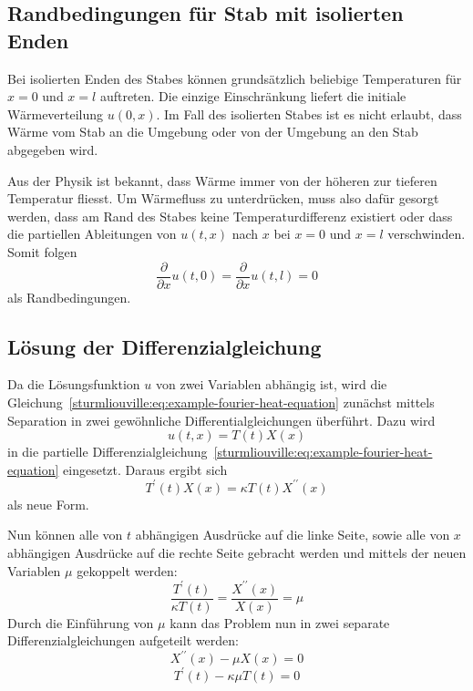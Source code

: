 %
%

\subsection{Randbedingungen für Stab mit isolierten Enden}

Bei isolierten Enden des Stabes können grundsätzlich beliebige Temperaturen für
$x = 0$ und $x = l$ auftreten.
Die einzige Einschränkung liefert die initiale Wärmeverteilung $u(0, x)$.
Im Fall des isolierten Stabes ist es nicht erlaubt, dass Wärme vom Stab
an die Umgebung oder von der Umgebung an den Stab abgegeben wird.

Aus der Physik ist bekannt, dass Wärme immer von der höheren zur tieferen
Temperatur fliesst. Um Wärmefluss zu unterdrücken, muss also dafür gesorgt
werden, dass am Rand des Stabes keine Temperaturdifferenz existiert oder 
dass die partiellen Ableitungen von $u(t,x)$ nach $x$ bei $x = 0$ und $x = l$
verschwinden.
Somit folgen
\begin{equation}
    \label{sturmliouville:eq:example-fourier-boundary-condition-ends-isolated}
    \frac{\partial}{\partial x} u(t, 0)
    =
    \frac{\partial}{\partial x} u(t, l)
    =
    0
\end{equation}
als Randbedingungen.

%
%

\subsection{Lösung der Differenzialgleichung}

Da die Lösungsfunktion $u$ von zwei Variablen abhängig ist, wird die
Gleichung~\eqref{sturmliouville:eq:example-fourier-heat-equation} zunächst
mittels Separation in zwei gewöhnliche Differentialgleichungen überführt.
Dazu wird 
\[
    u(t,x)
    =
    T(t)X(x)
\]
in die partielle
Differenzialgleichung~\eqref{sturmliouville:eq:example-fourier-heat-equation}
eingesetzt.
Daraus ergibt sich 
\[
    T^{\prime}(t)X(x)
    =
    \kappa T(t)X^{\prime \prime}(x)
\]
als neue Form.

Nun können alle von $t$ abhängigen Ausdrücke auf die linke Seite, sowie alle
von $x$ abhängigen Ausdrücke auf die rechte Seite gebracht werden und mittels
der neuen Variablen $\mu$ gekoppelt werden:
\[
    \frac{T^{\prime}(t)}{\kappa T(t)}
    =
    \frac{X^{\prime \prime}(x)}{X(x)}
    =
    \mu
\]
Durch die Einführung von $\mu$ kann das Problem nun in zwei separate
Differenzialgleichungen aufgeteilt werden:
\begin{equation}
    \label{sturmliouville:eq:example-fourier-separated-x}
    X^{\prime \prime}(x) - \mu X(x)
    =
    0
\end{equation}
\begin{equation}
    \label{sturmliouville:eq:example-fourier-separated-t}
    T^{\prime}(t) - \kappa \mu T(t)
    =
    0
\end{equation}

